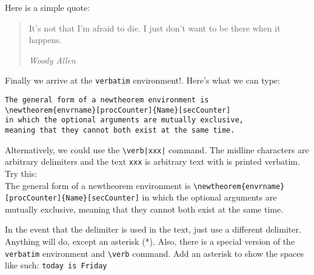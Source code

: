 \documentclass[12pt]{amsart}
\theoremstyle{plain}
\newtheorem{name of environment}{Typeset Proclamation} %
\newtheorem*{no numbering}{No Numbering}
\theoremstyle{definition}
\theoremstyle{remark}
\begin{document}
Here is a simple quote:
\begin{quotation}
It's not that I'm afraid to die. I just don't want to be there when it happens. \\
\begin{flushright}
\emph{Woody Allen}
\end{flushright}
\end{quotation}
Finally we arrive at the \texttt{verbatim} environment!. Here's what we can type:
\begin{verbatim}
The general form of a newtheorem environment is
\newtheorem{envrname}[procCounter]{Name}[secCounter] 
in which the optional arguments are mutually exclusive, 
meaning that they cannot both exist at the same time.
\end{verbatim}
Alternatively, we could use the \verb+\verb|xxx|+ command. The midline characters are arbitrary delimiters and the text \texttt{xxx} is arbitrary text with is printed verbatim. Try this: \\
The general form of a newtheorem environment is \verb|\newtheorem{envrname}[procCounter]{Name}[secCounter]| in which the optional arguments are mutually exclusive, meaning that they cannot both exist at the same time.
\vspace{12pt}

In the event that the delimiter is used in the text, just use a different delimiter. Anything will do, except an asterisk (*). Also, there is a special version of the \texttt{verbatim} environment and \verb+\verb+ command. Add an asterisk to show the spaces like such:
\verb*|today is Friday|
\end{document}
